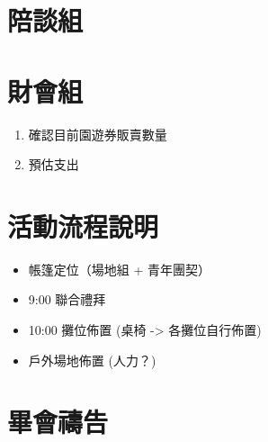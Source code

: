 \documentclass[a4paper, 12pt]{article}
\begin{document}
\begin{CJK}{UTF8}{bkai}
\section{陪談組}



\section{財會組}
\begin{enumerate}
  \item 確認目前園遊券販賣數量
  \item 預估支出
\end{enumerate}


\section{活動流程說明}
\begin{itemize}
  \item 帳篷定位（場地組 + 青年團契）
  \item 9:00 聯合禮拜
  \item 10:00 攤位佈置 (桌椅 -> 各攤位自行佈置)
  \item 戶外場地佈置 (人力？)
\end{itemize}

\section{畢會禱告}







\end{CJK}
\end{document}
